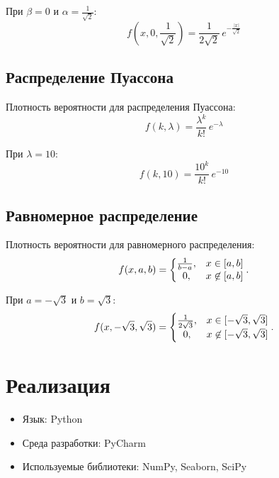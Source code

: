 При \( \beta = 0 \) и \( \alpha = \frac{1}{\sqrt{2}} \):
\begin{equation} 
f(x, 0, \frac{1}{\sqrt{2}}) = \frac{1}{2\sqrt{2}} \, e^{-\frac{|x|}{\sqrt{2}}}
\end{equation}


\subsection{Распределение Пуассона}

Плотность вероятности для распределения Пуассона:
\begin{equation} 
f(k, \lambda) = \frac{\lambda^k}{k!}\, e^{-\lambda}
\end{equation}

При \( \lambda = 10 \):
\begin{equation} 
f(k, 10) = \frac{10^k}{k!}\, e^{-10}
\end{equation}

\subsection{Равномерное распределение}
Плотность вероятности для равномерного распределения:
\begin{equation} 
f(x, a, b) = \left\{
\begin{matrix}
{1 \over b-a}, & x\in [a,b] \\
0, & x\not\in [a,b]
\end{matrix}
\right..
\end{equation}

При \( a = -\sqrt{3} \) и \( b = \sqrt{3} \):
\begin{equation} 
f(x, -\sqrt{3}, \sqrt{3}) = \left\{
\begin{matrix}
{1 \over 2\sqrt{3}}, & x\in [-\sqrt{3},\sqrt{3}] \\
0, & x\not\in [-\sqrt{3},\sqrt{3}]
\end{matrix}
\right..
\end{equation}


\section{Реализация}
\begin{itemize}
\item Язык: Python
\item Среда разработки: PyCharm
\item Используемые библиотеки: NumPy, Seaborn, SciPy
\end{itemize}


